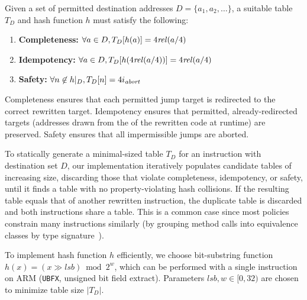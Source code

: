 Given a set of permitted destination addresses $D = \{a_1, a_2, \dots\}$, a suitable table $T_D$ and hash function $h$ must satisfy the following:
\begin{enumerate}
\item \textbf{Completeness:} $\forall a \in D, T_D[h(a)] = 4\mathit{rel}(a/4)$
\item \textbf{Idempotency:} $\forall a \in D, T_D[h(4\mathit{rel}(a/4))] = 4\mathit{rel}(a/4)$
%
\item \textbf{Safety:} $\forall n\not\in h|_D, T_D[n] = 4i_\mathit{abort}$
\end{enumerate}
Completeness ensures that each permitted jump target is redirected to the correct rewritten \Block target.
Idempotency ensures that permitted, already-redirected targets (\eg addresses drawn from the \PC of the rewritten code at runtime) are preserved.
Safety ensures that all impermissible jumps are aborted.

To statically generate a minimal-sized table $T_D$ for an instruction with destination set $D$, our implementation iteratively populates candidate tables of increasing size, discarding those that violate completeness, idempotency, or safety, until it finds a table with no property-violating hash collisions.
If the resulting table equals that of another rewritten instruction, the duplicate table is discarded and both instructions share a table.
This is a common case since most policies constrain many instructions similarly (\eg by grouping method calls into equivalence classes by type signature~\cite{tau_cfi}).

To implement hash function $h$ efficiently, we choose bit-substring function $h(x) = ({x}\gg\mathit{lsb}) \bmod 2^w$,
which can be performed with a single instruction on ARM (\texttt{UBFX}, unsigned bit field extract).
Parameters $\mathit{lsb},w\in[0,32)$ are chosen to minimize table size $|T_D|$.

